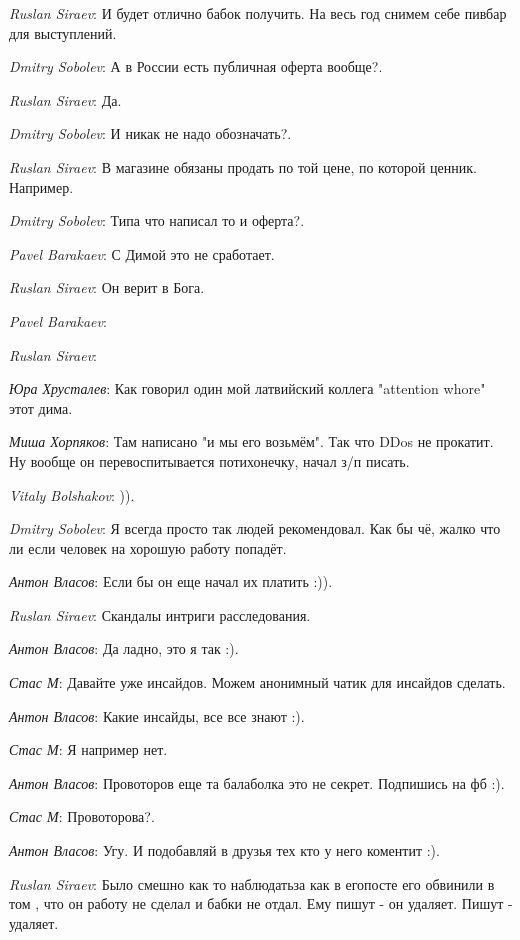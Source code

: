 \documentclass[10pt]{book}
\newcommand{\AUTHOR}[1]{\emph{#1}:}
\begin{document}
\AUTHOR{Ruslan Siraev} И будет отлично бабок получить. На весь год снимем себе пивбар для выступлений.

\AUTHOR{Dmitry Sobolev} А в России есть публичная оферта вообще?.

\AUTHOR{Ruslan Siraev} Да.

\AUTHOR{Dmitry Sobolev} И никак не надо обозначать?.

\AUTHOR{Ruslan Siraev} В магазине обязаны продать по той цене, по которой ценник. Например.

\AUTHOR{Dmitry Sobolev} Типа что написал то и оферта?.

\AUTHOR{Pavel Barakaev} С Димой это не сработает.

\AUTHOR{Ruslan Siraev} Он верит в Бога.

\AUTHOR{Pavel Barakaev}

\AUTHOR{Ruslan Siraev}

\AUTHOR{Юра Хрусталев} Как говорил один мой латвийский коллега "attention whore" этот дима.

\AUTHOR{Миша Хорпяков} Там написано "и мы его возьмём". Так что DDos не прокатит. Ну вообще он перевоспитывается потихонечку, начал з/п писать.

\AUTHOR{Vitaly Bolshakov} )).

\AUTHOR{Dmitry Sobolev} Я всегда просто так людей рекомендовал. Как бы чё, жалко что ли если человек на хорошую работу попадёт.

\AUTHOR{Антон Власов} Если бы он еще начал их платить :)).

\AUTHOR{Ruslan Siraev} Скандалы интриги расследования.

\AUTHOR{Антон Власов} Да ладно, это я так :).

\AUTHOR{Стас М} Давайте уже инсайдов. Можем анонимный чатик для инсайдов сделать.

\AUTHOR{Антон Власов} Какие инсайды, все все знают :).

\AUTHOR{Стас М} Я например нет.

\AUTHOR{Антон Власов} Провоторов еще та балаболка это не секрет. Подпишись на фб :).

\AUTHOR{Стас М} Провоторова?.

\AUTHOR{Антон Власов} Угу. И подобавляй в друзья тех кто у него коментит :).

\AUTHOR{Ruslan Siraev} Было смешно как то наблюдатьза как в егопосте его обвинили в том , что он работу не сделал и бабки не отдал. Ему пишут - он удаляет. Пишут - удаляет.
\end{document}
